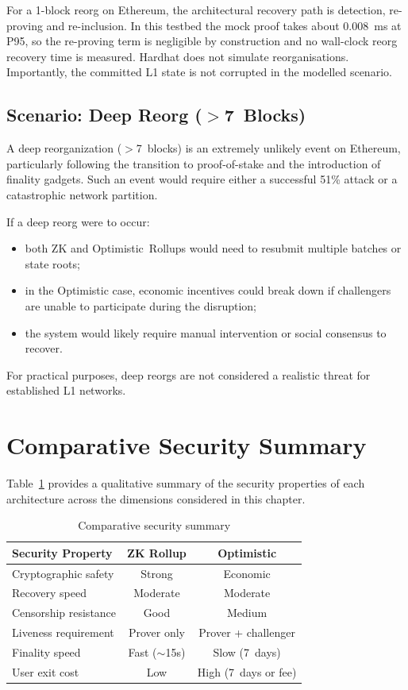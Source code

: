 For a 1-block reorg on Ethereum, the architectural recovery path is detection, re-proving and re-inclusion. In this testbed the mock proof takes about 0.008~ms at P95, so the re-proving term is negligible by construction and no wall-clock reorg recovery time is measured. Hardhat does not simulate reorganisations. Importantly, the committed L1 state is not corrupted in the modelled scenario.

\subsection{Scenario: Deep Reorg ($>$7~Blocks)}

A deep reorganization ($>$7~blocks) is an extremely unlikely event on Ethereum, particularly following the transition to proof-of-stake and the introduction of finality gadgets. Such an event would require either a successful 51\% attack or a catastrophic network partition.

If a deep reorg were to occur:
\begin{itemize}
    \item both ZK and Optimistic~Rollups would need to resubmit multiple batches or state roots;
    \item in the Optimistic case, economic incentives could break down if challengers are unable to participate during the disruption;
    \item the system would likely require manual intervention or social consensus to recover.
\end{itemize}

For practical purposes, deep reorgs are not considered a realistic threat for established L1 networks.

\section{Comparative Security Summary}

Table~\ref{tab:security-summary} provides a qualitative summary of the security properties of each architecture across the dimensions considered in this chapter.

\begin{table}[h]
    \centering
    \begin{tabular}{l|c|c}
        \hline
        \textbf{Security Property} & \textbf{ZK Rollup} & \textbf{Optimistic} \\
        \hline
        Cryptographic safety & Strong & Economic \\
        \hline
        Recovery speed & Moderate & Moderate \\
        \hline
        Censorship resistance & Good & Medium \\
        \hline
        Liveness requirement & Prover only & Prover + challenger \\
        \hline
        Finality speed & Fast ($\sim$15s) & Slow (7~days) \\
        \hline
        User exit cost & Low & High (7~days or fee) \\
        \hline
    \end{tabular}
    \caption{Comparative security summary}
    \label{tab:security-summary}
\end{table}

